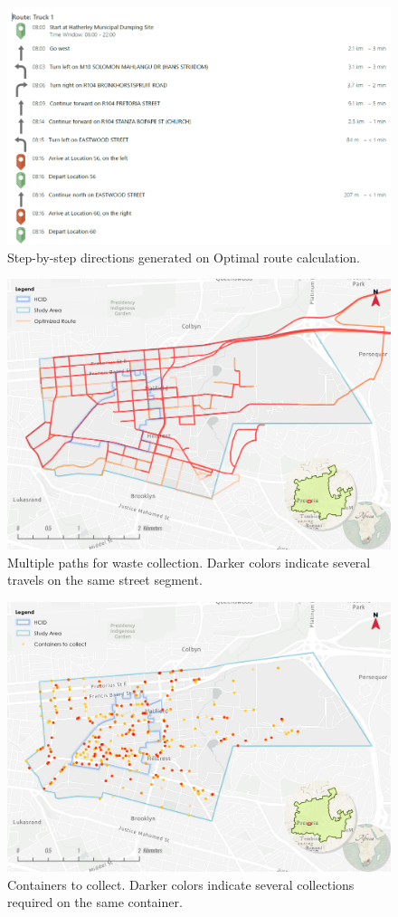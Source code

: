 \documentclass[authoryear,preprint,review,11pt,doubleblind]{elsarticle}
\begin{document}
    \begin{figure}[h!]
    \centering
        \includegraphics[width=0.9\linewidth]{Figures/road4.png}
        \caption{Step-by-step directions generated on Optimal route calculation.}
        \label{fig:road4}
    \end{figure}

    \begin{figure}[h!]
    \centering
        \includegraphics[width=0.8\linewidth]{Figures/Optimal Several runs.png}
        \caption{Multiple paths for waste collection. Darker colors indicate several travels on the same street segment.}
        \label{fig:road5}
    \end{figure}

    \begin{figure}[h!]
    \centering
        \includegraphics[width=0.8\linewidth]{Figures/Collected containers.png}
        \caption{Containers to collect. Darker colors indicate several collections required on the same container.}
        \label{fig:road6}
    \end{figure}
\end{document}
